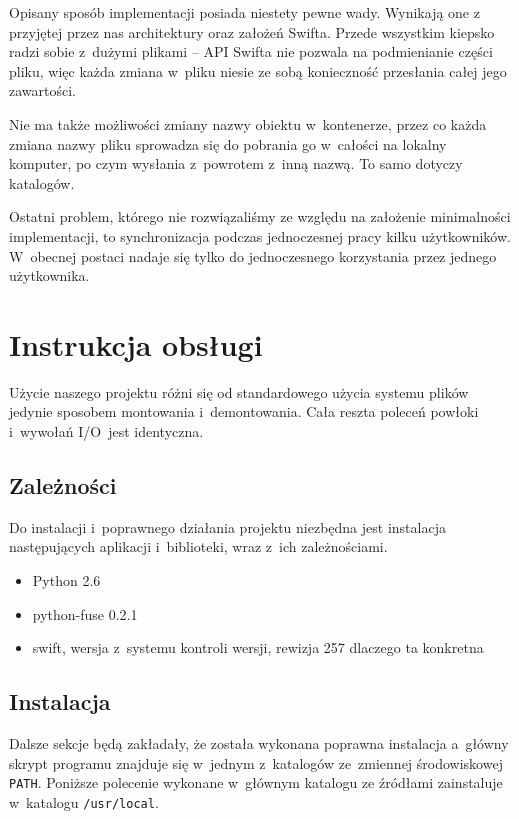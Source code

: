 Opisany sposób implementacji posiada niestety pewne wady. Wynikają one z
przyjętej przez nas architektury oraz założeń Swifta. Przede wszystkim \cb{}
kiepsko radzi sobie z~dużymi plikami -- API Swifta nie pozwala na podmienianie
części pliku, więc każda zmiana w~pliku niesie ze sobą konieczność przesłania
całej jego zawartości.

Nie ma także możliwości zmiany nazwy obiektu w~kontenerze, przez co każda zmiana
nazwy pliku sprowadza się do pobrania go w~całości na lokalny komputer, po czym
wysłania z~powrotem z~inną nazwą. To samo dotyczy katalogów.

Ostatni problem, którego nie rozwiązaliśmy ze względu na założenie minimalności
implementacji, to synchronizacja podczas jednoczesnej pracy kilku użytkowników.
W~obecnej postaci \cb{} nadaje się tylko do jednoczesnego korzystania przez
jednego użytkownika.

\section{Instrukcja obsługi}
Użycie naszego projektu różni się od standardowego użycia systemu plików
jedynie sposobem montowania i~demontowania. Cała reszta poleceń powłoki
i~wywołań I/O~jest identyczna.

\subsection{Zależności}

Do instalacji i~poprawnego działania projektu \cb{} niezbędna jest instalacja
następujących aplikacji i~biblioteki, wraz z~ich zależnościami.

\begin{itemize}
	\item{Python 2.6}
	\item{python-fuse 0.2.1}
	\item{swift, wersja z~systemu kontroli wersji, rewizja 257 \todo dlaczego
		ta konkretna}
\end{itemize}

\subsection{Instalacja}

Dalsze sekcje będą zakładały, że została wykonana poprawna instalacja a~główny
skrypt programu znajduje się w~jednym z~katalogów ze~zmiennej środowiskowej
\texttt{PATH}. Poniższe polecenie wykonane w~głównym katalogu ze źródłami
zainstaluje \cb{} w~katalogu \texttt{/usr/local}.

